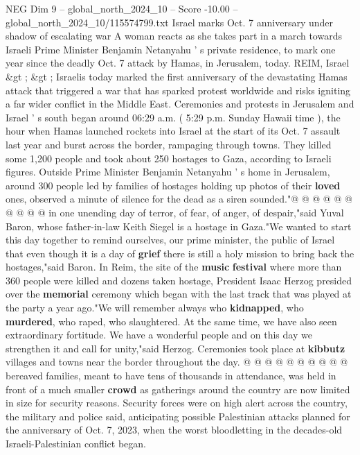 \begin{textsample}{NEG Dim 9 – global\_north\_2024\_10 – Score -10.00 – global\_north\_2024\_10/115574799.txt}  \label{ex:f9_neg_042}
Israel marks Oct. 7 anniversary under shadow of escalating war A woman reacts as she takes part in a march towards Israeli Prime Minister Benjamin Netanyahu ' s private residence, to mark one year since the deadly Oct. 7 attack by Hamas, in Jerusalem, today.
REIM, Israel \&gt ; \&gt ; Israelis today marked the first anniversary of the devastating Hamas attack that triggered a war that has sparked protest worldwide and risks igniting a far wider conflict in the Middle East.
Ceremonies and protests in Jerusalem and Israel ' s south began around 06:29 a.m. ( 5:29 p.m.
Sunday Hawaii time ), the hour when Hamas launched rockets into Israel at the start of its Oct. 7 assault last year and burst across the border, rampaging through towns.
They killed some 1,200 people and took about 250 hostages to Gaza, according to Israeli figures.
Outside Prime Minister Benjamin Netanyahu ' s home in Jerusalem, around 300 people led by families of hostages holding up photos of their \textbf{loved} ones, observed a minute of silence for the dead as a siren sounded."@ @ @ @ @ @ @ @ @ @ in one unending day of terror, of fear, of anger, of despair,"said Yuval Baron, whose father-in-law Keith Siegel is a hostage in Gaza."We wanted to start this day together to remind ourselves, our prime minister, the public of Israel that even though it is a day of \textbf{grief} there is still a holy mission to bring back the hostages,"said Baron.
In Reim, the site of the \textbf{music} \textbf{festival} where more than 360 people were killed and dozens taken hostage, President Isaac Herzog presided over the \textbf{memorial} ceremony which began with the last track that was played at the party a year ago."We will remember always who \textbf{kidnapped}, who \textbf{murdered}, who raped, who slaughtered.
At the same time, we have also seen extraordinary fortitude.
We have a wonderful people and on this day we strengthen it and call for unity,"said Herzog.
Ceremonies took place at \textbf{kibbutz} villages and towns near the border throughout the day. @ @ @ @ @ @ @ @ @ @ bereaved families, meant to have tens of thousands in attendance, was held in front of a much smaller \textbf{crowd} as gatherings around the country are now limited in size for security reasons.
Security forces were on high alert across the country, the military and police said, anticipating possible Palestinian attacks planned for the anniversary of Oct. 7, 2023, when the worst bloodletting in the decades-old Israeli-Palestinian conflict began.

\end{textsample}
